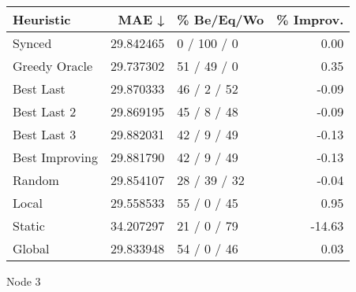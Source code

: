 \begin{tabular}{lrlr}
\toprule
      Heuristic &      MAE ↓ &    \% Be/Eq/Wo & \% Improv. \\
\midrule
         Synced &  29.842465 &   0 / 100 / 0 &      0.00 \\
  Greedy Oracle &  29.737302 &   51 / 49 / 0 &      0.35 \\
      Best Last &  29.870333 &   46 / 2 / 52 &     -0.09 \\
    Best Last 2 &  29.869195 &   45 / 8 / 48 &     -0.09 \\
    Best Last 3 &  29.882031 &   42 / 9 / 49 &     -0.13 \\
 Best Improving &  29.881790 &   42 / 9 / 49 &     -0.13 \\
         Random &  29.854107 &  28 / 39 / 32 &     -0.04 \\
          Local &  29.558533 &   55 / 0 / 45 &      0.95 \\
         Static &  34.207297 &   21 / 0 / 79 &    -14.63 \\
         Global &  29.833948 &   54 / 0 / 46 &      0.03 \\
\bottomrule
\end{tabular}
\caption{Node 3}
\label{tab:non_lr005_le1_bs2_3}
